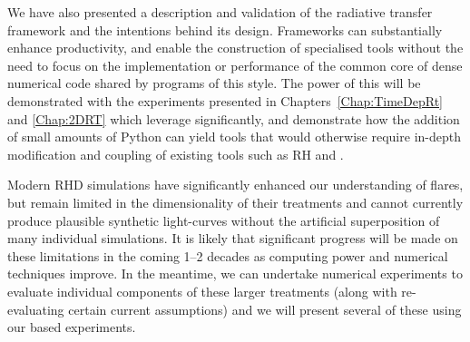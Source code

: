 We have also presented a description and validation of the \Lw{} radiative transfer framework and the intentions behind its design.
Frameworks can substantially enhance productivity, and enable the construction of specialised tools without the need to focus on the implementation or performance of the common core of dense numerical code shared by programs of this style.
The power of this will be demonstrated with the experiments presented in Chapters~\ref{Chap:TimeDepRt} and \ref{Chap:2DRT} which leverage \Lw{} significantly, and demonstrate how the addition of small amounts of Python can yield tools that would otherwise require in-depth modification and coupling of existing tools such as RH and \Radyn{}.

Modern RHD simulations have significantly enhanced our understanding of flares, but remain limited in the dimensionality of their treatments and cannot currently produce plausible synthetic light-curves without the artificial superposition of many individual simulations.
It is likely that significant progress will be made on these limitations in the coming 1--2 decades as computing power and numerical techniques improve.
In the meantime, we can undertake numerical experiments to evaluate individual components of these larger treatments (along with re-evaluating certain current assumptions) and we will present several of these using our \Lw{} based experiments.